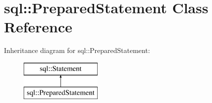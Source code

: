\hypertarget{classsql_1_1_prepared_statement}{}\section{sql\+:\+:Prepared\+Statement Class Reference}
\label{classsql_1_1_prepared_statement}
Inheritance diagram for sql\+:\+:Prepared\+Statement\+:\begin{figure}[H]
\begin{center}
\leavevmode
\includegraphics[height=2.000000cm]{classsql_1_1_prepared_statement}
\end{center}
\end{figure}
